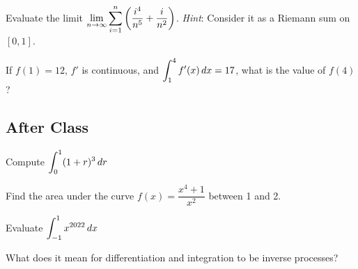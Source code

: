 \documentclass[notes]{subfiles}
\begin{document}
		\begin{ex}
			Evaluate the limit $\displaystyle \lim_{n\to \infty} \sum_{i=1}^n \left( \dfrac{i^4}{n^5} + \dfrac{i}{n^2}\right)$.  \emph{Hint}: Consider it as a Riemann sum on $[0,1]$.
		\end{ex}
		
		\begin{ex}
			If $f(1) = 12$, $f'$ is continuous, and $\displaystyle \int_1^4 f'(x)\, dx = 17$, what is the value of $f(4)$?
		\end{ex}	
			\newpage
	
	\subsection*{After Class}
		\begin{ex}
			Compute $\displaystyle \int_0^1 (1+r)^3\, dr$
		\end{ex}
			
		\begin{ex}
			Find the area under the curve $f(x) = \dfrac{x^4 + 1}{x^2}$ between 1 and 2.
		\end{ex}

		\begin{ex}
			Evaluate $\displaystyle \int_{-1}^1 x^{2022}\, dx$
		\end{ex}
			
		\begin{ex}
			What does it mean for differentiation and integration to be inverse processes?
		\end{ex}
	\clearpage	
\end{document}
